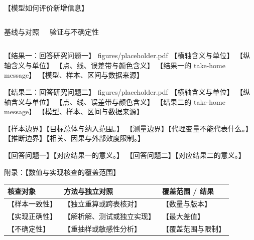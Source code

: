 \documentclass[aspectratio=169,11pt,fontset=fandol]{ctexbeamer}
\begin{document}
\begin{frame}{【模型如何评价新增信息】}
  \centering
  \par
  \vspace{.8em}
  \begin{columns}[T,onlytextwidth]
      {\color{Accent}基线与对照}\par
      {\color{Accent}验证与不确定性}\par
  \end{columns}
\end{frame}

\fullfigureslide
  {【结果一：回答研究问题一】}
  {figures/placeholder.pdf}
  {【横轴含义与单位】}
  {【纵轴含义与单位】}
  {【点、线、误差带与颜色含义】}
  {【结果一的 take-home message】}
  {【模型、样本、区间与数据来源】}

\fullfigureslide
  {【结果二：回答研究问题二】}
  {figures/placeholder.pdf}
  {【横轴含义与单位】}
  {【纵轴含义与单位】}
  {【点、线、误差带与颜色含义】}
  {【结果二的 take-home message】}
  {【模型、样本、区间与数据来源】}

  {【样本边界】}{【目标总体与纳入范围。】}
  {【测量边界】}{【代理变量不能代表什么。】}
  {【推断边界】}{【相关、因果与外部效度限制。】}

  {【回答问题一】}{【对应结果一的意义。】}
  {【回答问题二】}{【对应结果二的意义。】}


\appendix

\begin{frame}{附录：【数值与实现核查的覆盖范围】}
  \setlength{\tabcolsep}{3pt}
  \begin{tabular}{@{}p{3.0cm} p{6.0cm} p{4.5cm}@{}}
    \toprule
    核查对象 & 方法与独立对照 & 覆盖范围 / 结果 \\
    \midrule
    【样本一致性】 & 【独立重算或跨表核对】 & 【数量与版本】 \\
    【实现正确性】 & 【解析解、测试或独立实现】 & 【最大差值】 \\
    【不确定性】 & 【重抽样或敏感性分析】 & 【覆盖范围与限制】 \\
    \bottomrule
  \end{tabular}
\end{frame}
\end{document}
